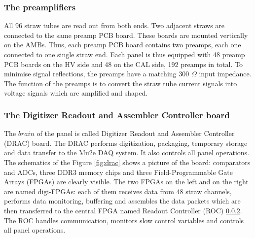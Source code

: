\subsubsection{The preamplifiers}\label{preampss}
All 96 straw tubes are read out from both ends. 
Two adjacent straws are connected to the same preamp PCB board. 
These boards are mounted vertically on the AMBs. 
Thus, each preamp PCB board contains two preamps,  
each one connected to one single straw end. 
Each panel is thus equipped with 48 preamp PCB boards on the HV 
side and 48 on the CAL side, 192 preamps in total.
To minimise signal reflections, the preamps have a matching 300 $\Omega$ input impedance. 
The function of the preamps is to convert the straw tube  
current signals into voltage signals which are amplified and shaped. 

\subsubsection{The Digitizer Readout and Assembler Controller board}\label{DRAC}
The $brain$ of the panel is called Digitizer Readout and Assembler Controller (DRAC) board. 
The DRAC performs digitization, packaging, temporary storage and data transfer to 
the Mu2e DAQ system. It also controls all panel operations. The schematics of the 
Figure \ref{fig:drac} shows a picture of the board: comparators 
and ADCs, three DDR3 memory chips and three Field-Programmable Gate Arrays (FPGAs) 
are clearly visible. 
The two FPGAs on the left and on the right are named digi-FPGAs: 
each of them receives data from 48 straw channels, performs data 
monitoring, buffering and assembles the data packets which are then 
transferred to the central FPGA named Readout Controller (ROC) \ref{DRAC}. 
The ROC handles communication, monitors slow control variables and 
controls all panel operations.

